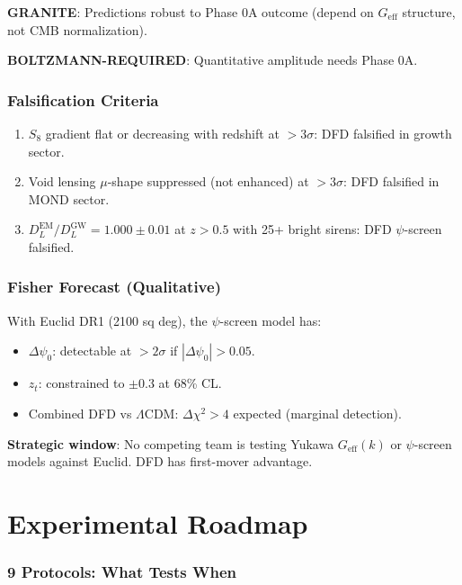 \documentclass[11pt,a4paper]{article}
\begin{document}
\textbf{GRANITE}: Predictions robust to Phase 0A outcome (depend on $G_\text{eff}$ structure, not CMB normalization).

\textbf{BOLTZMANN-REQUIRED}: Quantitative amplitude needs Phase 0A.

\section{Falsification Criteria}

\begin{enumerate}
\item $S_8$ gradient flat or decreasing with redshift at $> 3\sigma$: DFD falsified in growth sector.
\item Void lensing $\mu$-shape suppressed (not enhanced) at $> 3\sigma$: DFD falsified in MOND sector.
\item $D_L^\text{EM}/D_L^\text{GW} = 1.000 \pm 0.01$ at $z > 0.5$ with 25+ bright sirens: DFD $\psi$-screen falsified.
\end{enumerate}

\section{Fisher Forecast (Qualitative)}

With Euclid DR1 (2100 sq deg), the $\psi$-screen model has:
\begin{itemize}
\item $\Delta\psi_0$: detectable at $> 2\sigma$ if $|\Delta\psi_0| > 0.05$.
\item $z_t$: constrained to $\pm 0.3$ at 68\% CL.
\item Combined DFD vs $\Lambda$CDM: $\Delta\chi^2 > 4$ expected (marginal detection).
\end{itemize}

\textbf{Strategic window}: No competing team is testing Yukawa $G_\text{eff}(k)$ or $\psi$-screen models against Euclid. DFD has first-mover advantage.


\part{Experimental Roadmap}
\label{part:experiments}

\section{9 Protocols: What Tests When}
\end{document}
